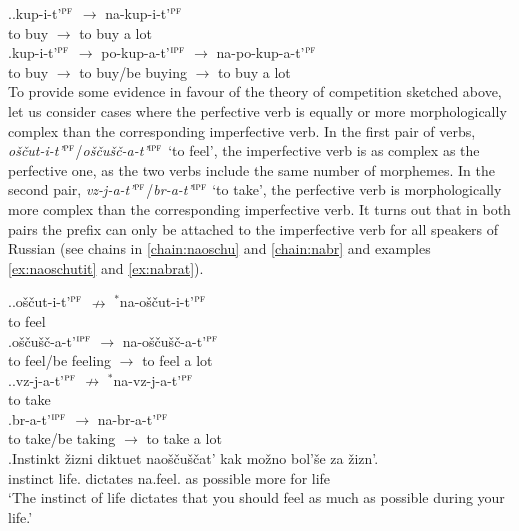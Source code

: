 \ex.\ag.\label{chain:nakupit}kup-i-t'$^{\textsc{pf}}$ $\rightarrow$ na-kup-i-t'$^{\textsc{pf}}$\\
{to buy} $\rightarrow$ {to buy a lot}\\
\bg.\label{chain:napokupat}kup-i-t'$^{\textsc{pf}}$ $\rightarrow$ po-kup-a-t'$^{\textsc{ipf}}$ $\rightarrow$ na-po-kup-a-t'$^{\textsc{pf}}$\\
{to buy} $\rightarrow$ {to buy/be buying} $\rightarrow$ {to buy a lot}\\

To provide some evidence in favour of the theory of competition sketched above, let us consider cases where the perfective verb is equally or more morphologically complex than the corresponding imperfective verb. In the first pair of verbs, \textit{o\v{s}\v{c}ut-i-t'}$^{\textsc{pf}}$\slash\textit{o\v{s}\v{c}u\v{s}\v{c}-a-t'}$^{\textsc{ipf}}$ `to feel', the imperfective verb is as complex as the perfective one, as the two verbs include the same number of morphemes. In the second pair, \textit{vz-j-a-t'}$^{\textsc{pf}}$\slash\textit{br-a-t'}$^{\textsc{ipf}}$ `to take', the perfective verb is morphologically more complex than the corresponding imperfective verb. It turns out that in both pairs the  prefix  can only be attached to the imperfective verb for all speakers of Russian (see chains in \ref{chain:naoschu} and \ref{chain:nabr} and examples \ref{ex:naoschutit} and \ref{ex:nabrat}). 

\ex.\label{chain:naoschu}\ag.o\v{s}\v{c}ut-i-t'$^{\textsc{pf}}$ $\nrightarrow$ $^*$na-o\v{s}\v{c}ut-i-t'$^{\textsc{pf}}$\label{chain:oschutit}\\
{to feel} {} {}\\
\bg.\label{chain:oschuschat}o\v{s}\v{c}u\v{s}\v{c}-a-t'$^{\textsc{ipf}}$ $\rightarrow$ na-o\v{s}\v{c}u\v{s}\v{c}-a-t'$^{\textsc{pf}}$\\
{to feel/be feeling} $\rightarrow$ {to feel a lot}\\

\ex.\label{chain:nabr}\ag.vz-j-a-t'$^{\textsc{pf}}$ $\nrightarrow$ $^*$na-vz-j-a-t'$^{\textsc{pf}}$\label{chain:navzjat}\\
{to take} {} {}\\
\bg.\label{chain:nabrat}br-a-t'$^{\textsc{ipf}}$ $\rightarrow$ na-br-a-t'$^{\textsc{pf}}$\\
{to take/be taking} $\rightarrow$ {to take a lot}\\

\exg.\label{ex:naoschutit}Instinkt \v{z}izni diktuet nao\v{s}\v{c}u\v{s}\v{c}at' kak mo\v{z}no bol'\v{s}e za \v{z}izn'.\\
instinct life. dictates na.feel. as possible more for life\\
\trans `The instinct of life dictates that you should feel as much as possible during your life.'

